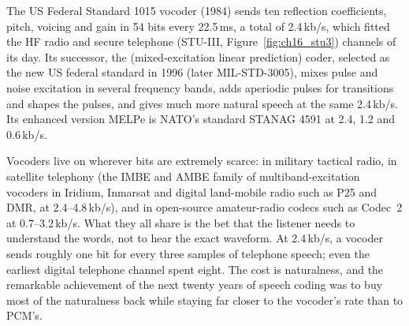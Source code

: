 
The US Federal Standard 1015  vocoder (1984) sends ten reflection coefficients, pitch,
voicing and gain in 54 bits every 22.5\,ms, a total of 2.4\,kb/s, which fitted the HF radio and secure
telephone (STU-III, Figure~\ref{fig:ch16_stu3}) channels of its day. Its successor, the  (mixed-excitation linear
prediction) coder, selected as the new US federal standard in 1996 (later MIL-STD-3005), mixes pulse
and noise excitation in several frequency bands, adds aperiodic pulses for transitions and shapes the
pulses, and gives much more natural speech at the same 2.4\,kb/s. Its enhanced version MELPe is
NATO's standard STANAG 4591 at 2.4, 1.2 and 0.6\,kb/s.

Vocoders live on wherever bits are extremely scarce: in military tactical radio, in satellite
telephony (the IMBE and AMBE family of multiband-excitation vocoders in Iridium, Inmarsat and
digital land-mobile radio such as P25 and DMR, at 2.4--4.8\,kb/s), and in open-source amateur-radio
codecs such as Codec~2 at 0.7--3.2\,kb/s. What they all share is the bet that the listener needs to
understand the words, not to hear the exact waveform. At 2.4\,kb/s, a vocoder sends roughly one bit
for every three samples of telephone speech; even the earliest digital telephone channel spent
eight. The cost is naturalness, and the remarkable achievement of the next twenty years of speech
coding was to buy most of the naturalness back while staying far closer to the vocoder's rate
than to PCM's.


